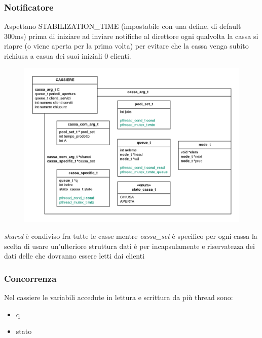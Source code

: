 \documentclass[11pt, a4paper]{article}
\begin{document}
\subsubsection{Notificatore}
Aspettano STABILIZATION\_TIME (impostabile con una define, di default 300ms) prima di iniziare ad inviare notifiche al direttore ogni qualvolta la cassa si riapre (o viene aperta per la prima volta) per evitare che la cassa venga subito richiusa a casua dei suoi iniziali 0 clienti.

\begin{figure}[h]
	\centering
	\includegraphics[scale=0.8]{cassa.png}
	\label{fig:cassa}
\end{figure}

\textit{shared} è condiviso fra tutte le casse mentre \textit{cassa\_set} è specifico per ogni cassa
la scelta di  usare un'ulteriore struttura dati è 
per  incapsulamente e riservatezza dei dati 
delle che dovranno essere letti dai clienti 
\subsubsection{Concorrenza}
Nel cassiere le variabili accedute in lettura e scrittura da più thread sono:
\begin{itemize}
\item q
\item stato
\end{itemize}
\end{document}
